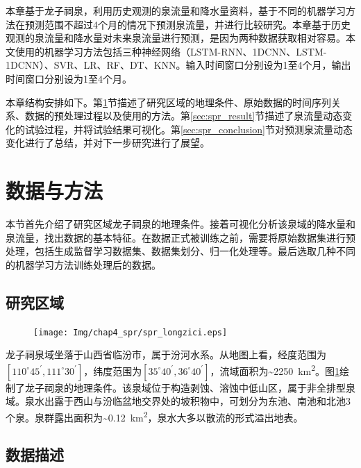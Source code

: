 本章基于龙子祠泉，利用历史观测的泉流量和降水量资料，基于不同的机器学习方法在预测范围不超过4个月的情况下预测泉流量，并进行比较研究。本章基于历史观测的泉流量和降水量对未来泉流量进行预测，是因为两种数据获取相对容易。本文使用的机器学习方法包括三种神经网络（LSTM-RNN、1DCNN、LSTM-1DCNN）、SVR、LR、RF、DT、KNN。输入时间窗口分别设为1至4个月，输出时间窗口分别设为1至4个月。

本章结构安排如下。第\ref{sec:spr_data_method}节描述了研究区域的地理条件、原始数据的时间序列关系、数据的预处理过程以及使用的方法。第\ref{sec:spr_result}节描述了泉流量动态变化的试验过程，并将试验结果可视化。第\ref{sec:spr_conclusion}节对预测泉流量动态变化进行了总结，并对下一步研究进行了展望。

\section{数据与方法}\label{sec:spr_data_method}

本节首先介绍了研究区域龙子祠泉的地理条件。接着可视化分析该泉域的降水量和泉流量，找出数据的基本特征。在数据正式被训练之前，需要将原始数据集进行预处理，包括生成监督学习数据集、数据集划分、归一化处理等。最后选取几种不同的机器学习方法训练处理后的数据。

\subsection{研究区域}\label{sec:spr_area}

\begin{figure}[!htbp]
  \centering
  \texttt{[image: Img/chap4\_spr/spr\_longzici.eps]}
  \label{fig:spri_longzici}
\end{figure}

龙子祠泉域坐落于山西省临汾市，属于汾河水系。从地图上看，经度范围为$[110^\circ 45^\prime,111^\circ 30^\prime]$，纬度范围为$[35^\circ 40^\prime,36^\circ 40^\prime]$，流域面积为\sim\SI{2250}{km^{2}}。图\ref{fig:spri_longzici}绘制了龙子祠泉的地理条件。该泉域位于构造剥蚀、溶蚀中低山区，属于非全排型泉域。泉水出露于西山与汾临盆地交界处的坡积物中，可划分为东池、南池和北池3个泉。泉群露出面积为\sim\SI{0.12}{km^{2}}，泉水大多以散流的形式溢出地表。

\subsection{数据描述}\label{sec:spr_deal_data}

